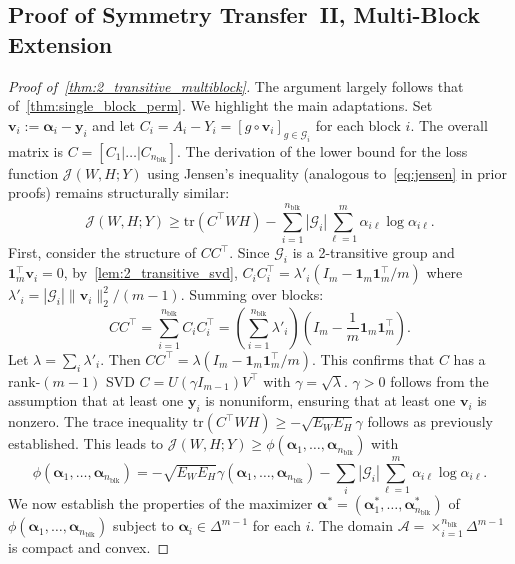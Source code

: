 \documentclass[11pt]{article}
\begin{document}
\subsection{Proof of Symmetry Transfer~II, Multi-Block Extension}
\label{pf:2_transitive_multiblock}

\begin{proof}[Proof of~\cref{thm:2_transitive_multiblock}]
The argument largely follows that of~\cref{thm:single_block_perm}. We highlight the main adaptations. Set $\boldsymbol{v}_i:=\boldsymbol{\alpha}_i-\boldsymbol{y}_i$ and let \(C_i = A_i - Y_i = [g\circ\boldsymbol{v}_i]_{g \in \mathcal G_i}\) for each block \(i\). The overall matrix is \(C = [C_1|\dots|C_{n_{\mathrm{blk}}}]\).
The derivation of the lower bound for the loss function \(\mathcal J(W,H;Y)\) using Jensen's inequality (analogous to~\cref{eq:jensen} in prior proofs) remains structurally similar:
\[ \mathcal J(W,H;Y) \ge \mathrm{tr}(C^{\top}WH) - \sum_{i=1}^{n_{\mathrm{blk}}} |\mathcal G_i|\sum_{\ell=1}^{m}\alpha_{i\ell}\log\alpha_{i\ell}. \]
First, consider the structure of \(CC^\top\). Since \(\mathcal G_i\) is a 2-transitive group and \(\boldsymbol{1}_m^\top \boldsymbol{v}_i = 0\), by~\cref{lem:2_transitive_svd}, \(C_i C_i^\top = \lambda'_i (I_m - \boldsymbol{1}_m\boldsymbol{1}_m^\top/m)\) where \(\lambda'_i = |\mathcal G_i|\|\boldsymbol{v}_i\|_2^2/(m-1)\).
Summing over blocks:
\[ CC^{\top} = \sum_{i=1}^{n_{\mathrm{blk}}} C_i C_i^\top = \left(\sum_{i=1}^{n_{\mathrm{blk}}} \lambda'_i\right) \left(I_m-\frac1m\boldsymbol{1}_m\boldsymbol{1}_m^{\top}\right). \]
Let \(\lambda = \sum_i \lambda'_i \). Then \(CC^\top = \lambda (I_m - \boldsymbol{1}_m\boldsymbol{1}_m^\top/m)\). This confirms that \(C\) has a rank-$(m-1)$ SVD \(C=U(\gamma I_{m-1})V^\top\) with \(\gamma = \sqrt{\lambda}\). \( \gamma > 0 \) follows from the assumption that at least one \(\boldsymbol{y}_i\) is nonuniform, ensuring that at least one \(\boldsymbol{v}_i\) is nonzero.
The trace inequality \(\mathrm{tr}(C^{\top}WH)\ge-\sqrt{E_W E_H}\gamma\) follows as previously established. This leads to \(\mathcal J(W,H;Y)\ge\phi(\boldsymbol{\alpha}_1,\dots,\boldsymbol{\alpha}_{n_{\mathrm{blk}}})\) with
\[ \phi(\boldsymbol{\alpha}_1,\dots,\boldsymbol{\alpha}_{n_{\mathrm{blk}}}) = -\sqrt{E_W E_H}\gamma(\boldsymbol{\alpha}_1,\dots,\boldsymbol{\alpha}_{n_{\mathrm{blk}}}) - \sum_i |\mathcal G_i|\sum_{\ell=1}^{m}\alpha_{i\ell}\log\alpha_{i\ell}. \]
We now establish the properties of the maximizer \(\boldsymbol{\alpha}^* = (\boldsymbol{\alpha}_1^*, \ldots, \boldsymbol{\alpha}_{n_{\mathrm{blk}}}^*)\) of \(\phi(\boldsymbol{\alpha}_1,\dots,\boldsymbol{\alpha}_{n_{\mathrm{blk}}})\) subject to \(\boldsymbol{\alpha}_i \in \Delta^{m-1}\) for each \(i\). The domain \(\mathcal{A} = \times_{i=1}^{n_{\mathrm{blk}}} \Delta^{m-1}\) is compact and convex.

\end{proof}
\end{document}
